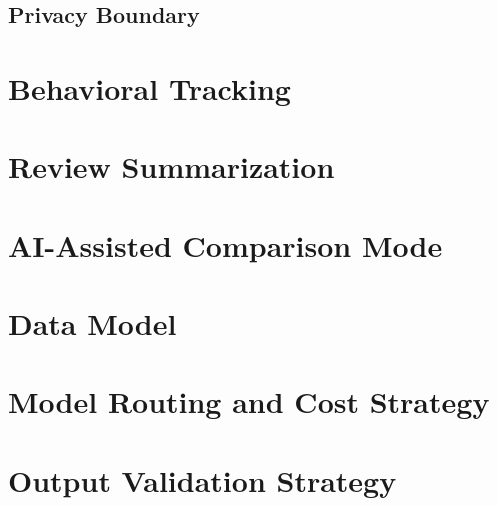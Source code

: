 
\subsection{Privacy Boundary}
\label{subsec:design-privacy}


\section{Behavioral Tracking}
\label{sec:design-behavior}


\section{Review Summarization}
\label{sec:design-reviews}


\section{AI-Assisted Comparison Mode}
\label{sec:design-comparison}


\section{Data Model}
\label{sec:design-data}


\section{Model Routing and Cost Strategy}
\label{sec:design-model-routing}


\section{Output Validation Strategy}
\label{sec:design-validation}

